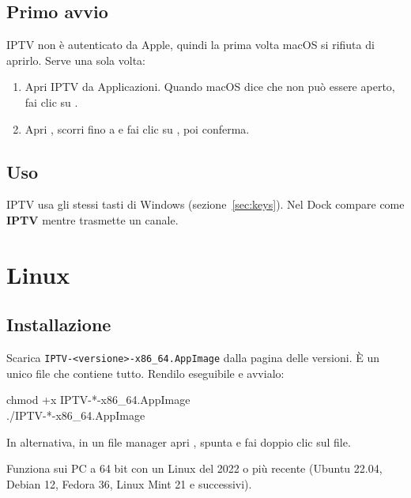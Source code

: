 \subsection{Primo avvio}
IPTV non è autenticato da Apple, quindi la prima volta macOS si rifiuta di
aprirlo. Serve una sola volta:
\begin{enumerate}
  \item Apri IPTV da Applicazioni. Quando macOS dice che non può essere
        aperto, fai clic su .
  \item Apri , scorri fino a  e fai
        clic su , poi conferma.
\end{enumerate}

\subsection{Uso}
IPTV usa gli stessi tasti di Windows (sezione~\ref{sec:keys}). Nel Dock
compare come \textbf{IPTV} mentre trasmette un canale.


\section{Linux}

\subsection{Installazione}
Scarica \texttt{IPTV-\textless versione\textgreater-x86\_64.AppImage} dalla
pagina delle versioni. È un unico file che contiene tutto. Rendilo
eseguibile e avvialo:
\begin{center}
\begin{minipage}{0.8\linewidth}
\small\ttfamily chmod +x IPTV-*-x86\_64.AppImage\\
./IPTV-*-x86\_64.AppImage
\end{minipage}
\end{center}
In alternativa, in un file manager apri , spunta  e fai doppio
clic sul file.

Funziona sui PC a 64 bit con un Linux del 2022 o più recente (Ubuntu 22.04,
Debian 12, Fedora 36, Linux Mint 21 e successivi).

